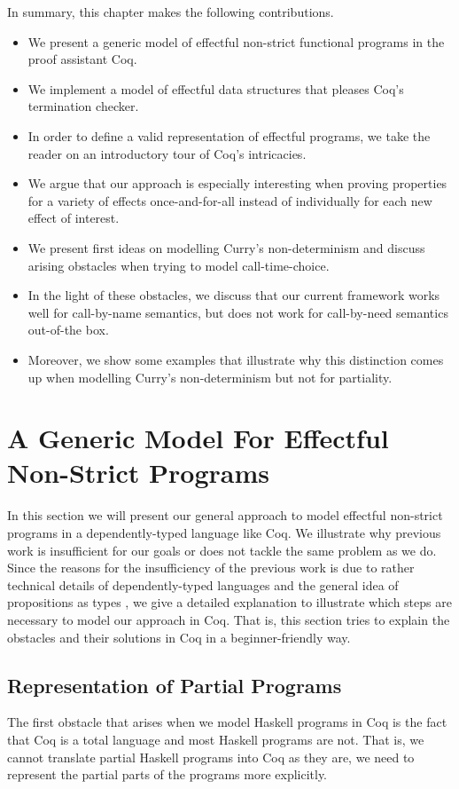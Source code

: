 In summary, this chapter makes the following contributions.

\begin{itemize}
\item We present a generic model of effectful non-strict functional programs in the proof assistant Coq.
\item We implement a model of effectful data structures that pleases Coq's termination checker.
\item In order to define a valid representation of effectful programs, we take the reader on an introductory tour of Coq's intricacies.
\item We argue that our approach is especially interesting when proving properties for a variety of effects once-and-for-all instead of individually for each new effect of interest.
\item We present first ideas on modelling Curry's non-determinism and discuss arising obstacles when trying to model call-time-choice.
\item In the light of these obstacles, we discuss that our current framework works well for call-by-name semantics, but does not work for call-by-need semantics out-of-the box.
\item Moreover, we show some examples that illustrate why this distinction comes up when modelling Curry's non-determinism but not for partiality.
\end{itemize}
 
\section{A Generic Model For Effectful Non-Strict Programs}

In this section we will present our general approach to model effectful non-strict programs in a dependently-typed language like Coq.
We illustrate why previous work is insufficient for our goals or does not tackle the same problem as we do.
Since the reasons for the insufficiency of the previous work is due to rather technical details of dependently-typed languages and the general idea of propositions as types \citep{wadler2015propositions}, we give a detailed explanation to illustrate which steps are necessary to model our approach in Coq.
That is, this section tries to explain the obstacles and their solutions in Coq in a beginner-friendly way.

\subsection{Representation of Partial Programs}
\label{subsec:partial}
The first obstacle that arises when we model Haskell programs in Coq is the fact that Coq is a total language and most Haskell programs are not.
That is, we cannot translate partial Haskell programs into Coq as they are, we need to represent the partial parts of the programs more explicitly.

